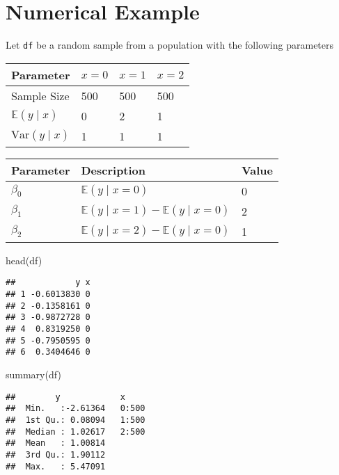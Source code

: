 \documentclass[
]{book}
\newenvironment{Shaded}{\begin{snugshade}}{\end{snugshade}}
\newcommand{\FunctionTok}[1]{\textcolor[rgb]{0.00,0.00,0.00}{#1}}
\newcommand{\NormalTok}[1]{#1}
\theoremstyle{definition}
\theoremstyle{definition}
\theoremstyle{definition}
\theoremstyle{remark}
\begin{document}
\hypertarget{numerical-example-1}{%
\section{Numerical Example}\label{numerical-example-1}}

Let \texttt{df} be a random sample from a population with the following parameters

\begin{tabular}{l|l|l|l}
\hline
Parameter & $x = 0$ & $x = 1$ & $x = 2$\\
\hline
Sample Size & 500 & 500 & 500\\
\hline
$\mathbb{E} \left( y \mid x \right)$ & 0 & 2 & 1\\
\hline
$\mathrm{Var} \left( y \mid x \right)$ & 1 & 1 & 1\\
\hline
\end{tabular}

\begin{tabular}{l|l|l}
\hline
Parameter & Description & Value\\
\hline
$\beta_0$ & $\mathbb{E} \left( y \mid x = 0 \right)$ & 0\\
\hline
$\beta_1$ & $\mathbb{E} \left( y \mid x = 1 \right) - \mathbb{E} \left( y \mid x = 0 \right)$ & 2\\
\hline
$\beta_2$ & $\mathbb{E} \left( y \mid x = 2 \right) - \mathbb{E} \left( y \mid x = 0 \right)$ & 1\\
\hline
\end{tabular}

\begin{Shaded}
\begin{Highlighting}[]
\FunctionTok{head}\NormalTok{(df)}
\end{Highlighting}
\end{Shaded}

\begin{verbatim}
##            y x
## 1 -0.6013830 0
## 2 -0.1358161 0
## 3 -0.9872728 0
## 4  0.8319250 0
## 5 -0.7950595 0
## 6  0.3404646 0
\end{verbatim}

\begin{Shaded}
\begin{Highlighting}[]
\FunctionTok{summary}\NormalTok{(df)}
\end{Highlighting}
\end{Shaded}

\begin{verbatim}
##        y            x      
##  Min.   :-2.61364   0:500  
##  1st Qu.: 0.08094   1:500  
##  Median : 1.02617   2:500  
##  Mean   : 1.00814          
##  3rd Qu.: 1.90112          
##  Max.   : 5.47091
\end{verbatim}
\end{document}
